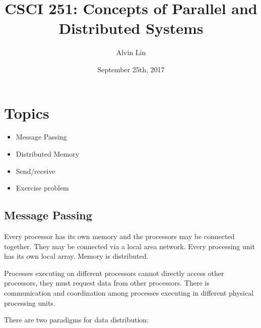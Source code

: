 \documentclass[letterpaper, 12pt]{math}
\title{CSCI 251: Concepts of Parallel and Distributed Systems}
\author{Alvin Lin}
\date{September 25th, 2017}
\begin{document}
\maketitle

\section*{Topics}
\begin{itemize}
  \item Message Passing
  \item Distributed Memory
  \item Send/receive
  \item Exercise problem
\end{itemize}

\subsection*{Message Passing}
Every processor has its own memory and the processors may be connected
together. They may be connected via a local area network. Every processing unit
has its own local array. Memory is distributed.
\begin{center}
\end{center}
Processes executing on different processors cannot directly access other
processors, they must request data from other processors. There is
communication and coordination among processes executing in different physical
processing units.
\begin{center}
\end{center}
There are two paradigms for data distribution:
\end{document}
